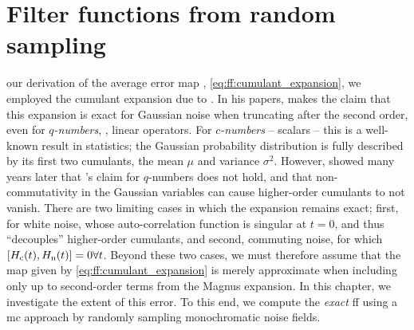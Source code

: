 \chapter{Filter functions from random sampling}\label{ch:ff:validation}
 our derivation of the average error map \liouvUeavg, \cref{eq:ff:cumulant_expansion}, we employed the cumulant expansion due to \textcite{Kubo1962,Kubo1963}.
In his papers, \citeauthor{Kubo1962} makes the claim that this expansion is exact for Gaussian noise when truncating after the second order, even for \emph{$q$-numbers}, \ie, linear operators.
For \emph{$c$-numbers} -- scalars -- this is a well-known result in statistics; the Gaussian probability distribution is fully described by its first two cumulants, the mean $\mu$ and variance $\sigma^2$.
However, \textcite{Fox1976} showed many years later that \citeauthor{Kubo1962}'s claim for $q$-numbers does not hold, and that non-commutativity in the Gaussian variables can cause higher-order cumulants to not vanish.
There are two limiting cases in which the expansion remains exact; first, for white noise, whose auto-correlation function is singular at $t=0$, and thus \enquote{decouples} higher-order cumulants, and second, commuting noise, for which $\comm{\Hc(t)}{\Hn(t)} = 0\forall t$.
Beyond these two cases, we must therefore assume that the map given by \cref{eq:ff:cumulant_expansion} is merely approximate when including only up to second-order terms from the Magnus expansion.
In this chapter, we investigate the extent of this error.
To this end, we compute the \emph{exact} \acrfull{ff} using a \acrfull{mc} approach by randomly sampling monochromatic noise fields.

